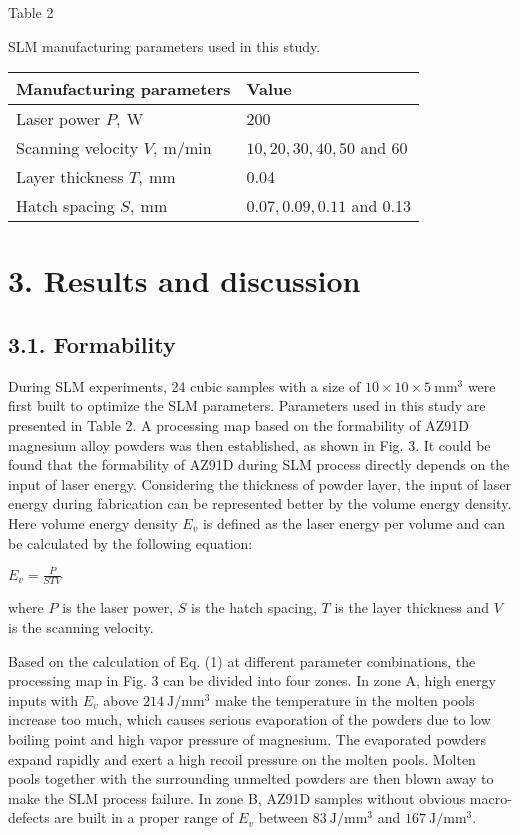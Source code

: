 \documentclass[10pt]{article}
\begin{document}
Table 2

SLM manufacturing parameters used in this study.

\begin{center}
\begin{tabular}{ll}
\hline
Manufacturing parameters & Value \\
\hline
Laser power $P, \mathrm{~W}$ & 200 \\
Scanning velocity $V, \mathrm{~m} / \mathrm{min}$ & $10,20,30,40,50$ and 60 \\
Layer thickness $T, \mathrm{~mm}$ & 0.04 \\
Hatch spacing $S, \mathrm{~mm}$ & $0.07,0.09,0.11$ and 0.13 \\
\end{tabular}
\end{center}

\section*{3. Results and discussion}
\subsection*{3.1. Formability}
During SLM experiments, 24 cubic samples with a size of $10 \times 10 \times 5 \mathrm{~mm}^{3}$ were first built to optimize the SLM parameters. Parameters used in this study are presented in Table 2. A processing map based on the formability of AZ91D magnesium alloy powders was then established, as shown in Fig. 3. It could be found that the formability of AZ91D during SLM process directly depends on the input of laser energy. Considering the thickness of powder layer, the input of laser energy during fabrication can be represented better by the volume energy density. Here volume energy density $E_{v}$ is defined as the laser energy per volume and can be calculated by the following equation:

$E_{v}=\frac{P}{S T V}$

where $P$ is the laser power, $S$ is the hatch spacing, $T$ is the layer thickness and $V$ is the scanning velocity.

Based on the calculation of Eq. (1) at different parameter combinations, the processing map in Fig. 3 can be divided into four zones. In zone A, high energy inputs with $E_{v}$ above $214 \mathrm{~J} / \mathrm{mm}^{3}$ make the temperature in the molten pools increase too much, which causes serious evaporation of the powders due to low boiling point and high vapor pressure of magnesium. The evaporated powders expand rapidly and exert a high recoil pressure on the molten pools. Molten pools together with the surrounding unmelted powders are then blown away to make the SLM process failure. In zone B, AZ91D samples without obvious macro-defects are built in a proper range of $E_{v}$ between $83 \mathrm{~J} / \mathrm{mm}^{3}$ and $167 \mathrm{~J} / \mathrm{mm}^{3}$.
\end{document}
